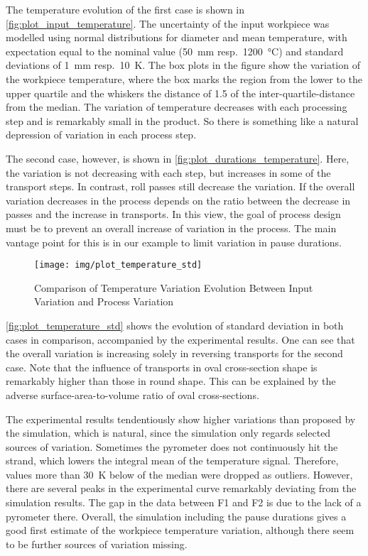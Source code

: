 The temperature evolution of the first case is shown in \autoref{fig:plot_input_temperature}.
The uncertainty of the input workpiece was modelled using normal distributions for diameter and mean temperature, with expectation equal to the nominal value (\qty{50}{\milli\meter} resp.~\qty{1200}{\celsius}) and standard deviations of \qty{1}{\milli\meter} resp.~\qty{10}{\kelvin}.
The box plots in the figure show the variation of the workpiece temperature, where the box marks the region from the lower to the upper quartile and the whiskers the distance of \num{1.5} of the inter-quartile-distance from the median.
The variation of temperature decreases with each processing step and is remarkably small in the product.
So there is something like a natural depression of variation in each process step.

The second case, however, is shown in \autoref{fig:plot_durations_temperature}.
Here, the variation is not decreasing with each step, but increases in some of the transport steps.
In contrast, roll passes still decrease the variation.
If the overall variation decreases in the process depends on the ratio between the decrease in passes and the increase in transports.
In this view, the goal of process design must be to prevent an overall increase of variation in the process.
The main vantage point for this is in our example to limit variation in pause durations.

\begin{figure}
    \centering
    \texttt{[image: img/plot\_temperature\_std]}
    \caption{Comparison of Temperature Variation Evolution Between Input Variation and Process Variation}
    \label{fig:plot_temperature_std}
\end{figure}

\autoref{fig:plot_temperature_std} shows the evolution of standard deviation in both cases in comparison, accompanied by the experimental results.
One can see that the overall variation is increasing solely in reversing transports for the second case.
Note that the influence of transports in oval cross-section shape is remarkably higher than those in round shape.
This can be explained by the adverse surface-area-to-volume ratio of oval cross-sections.

The experimental results tendentiously show higher variations than proposed by the simulation, which is natural, since the simulation only regards selected sources of variation.
Sometimes the pyrometer does not continuously hit the strand, which lowers the integral mean of the temperature signal.
Therefore, values more than \qty{30}{\kelvin} below of the median were dropped as outliers.
However, there are several peaks in the experimental curve remarkably deviating from the simulation results.
The gap in the data between F1 and F2 is due to the lack of a pyrometer there.
Overall, the simulation including the pause durations gives a good first estimate of the workpiece temperature variation, although there seem to be further sources of variation missing.

